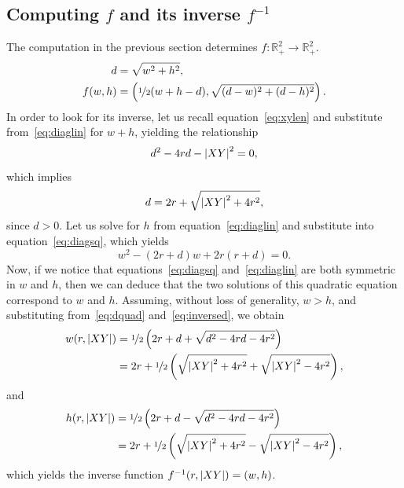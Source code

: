 \subsection{Computing $f$ and its inverse $f^{-1}$}

The computation in the previous section determines $f:
\mathbb{R}_+^2 \rightarrow \mathbb{R}_+^2$.
%
\begin{align}
  \begin{split}
    d &= \sqrt{w^2 + h^2}, \\
    f(w,h) &= \left( \nicefrac{1}{2}(w+h-d), \sqrt{(d-w)^2 + (d-h)^2} \right).
  \end{split}
  \label{eq:f}
\end{align}
%
In order to look for its inverse, let us recall equation~\eqref{eq:xylen} and
substitute from~\eqref{eq:diaglin} for $w+h$, yielding the relationship 
\begin{equation} 
 d^2 - 4rd - \left|{XY}\right|^2 = 0, 
 \label{eq:dquad}
\end{equation}
%
which implies 
%
\begin{equation}
  d = 2r + \sqrt{\left|{XY}\right|^2 + 4r^2}, 
  \label{eq:inversed}
\end{equation}
%
since $d > 0$. Let us solve for $h$ from equation~\eqref{eq:diaglin} and
substitute into equation~\eqref{eq:diagsq}, which yields \[ w^2 - (2r+d)w +
2r(r+d) = 0. \] Now, if we notice that equations~\eqref{eq:diagsq}
and~\eqref{eq:diaglin} are both symmetric in $w$ and $h$, then we can deduce
that the two solutions of this quadratic equation correspond to $w$ and $h$.
Assuming, without loss of generality, $w > h$, and substituting
from~\eqref{eq:dquad} and~\eqref{eq:inversed}, we obtain 
%
\begin{align*}
  w(r,\left|{XY}\right|) &= \nicefrac{1}{2}\left(2r+d + \sqrt{d^2 - 4rd - 4r^2} \right) \\ 
    &= 2r + \nicefrac{1}{2} \left( \sqrt{\left|{XY}\right|^2 + 4r^2} + \sqrt{\left|{XY}\right|^2 -
4r^2} \right),
\end{align*}
%
and 
%
\begin{align*}
  h(r,\left|{XY}\right|) &= \nicefrac{1}{2}\left(2r+d - \sqrt{d^2 - 4rd - 4r^2} \right) \\ 
    &= 2r + \nicefrac{1}{2} \left( \sqrt{\left|{XY}\right|^2 + 4r^2} - \sqrt{\left|{XY}\right|^2 -
4r^2} \right),
\end{align*}
%
which yields the inverse function $f^{-1}(r,\left|{XY}\right|) = (w,h)$.
